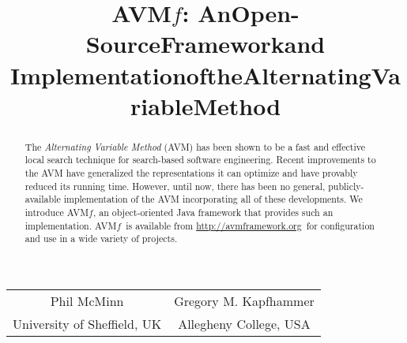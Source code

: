 \documentclass{llncs}
\newcommand{\AVM}{Alternating Variable Method\xspace}
\newcommand{\name}{\mbox{AVM\hspace{-1pt}$f$}\xspace}
\newcommand{\repourl}{\url{http://avmframework.org}\xspace}
\begin{document}
\title{\texorpdfstring{\name: An\:Open-Source\:Framework\:and\\$\!$$\!$$\!$Implementation\:of\:the\:Alternating\:Variable\:Method\vspace{-.75em}}{}}
\author{} %
\institute{} %
\maketitle

\vspace{-2em}
\begin{center}
\begin{tabular}{c@{\hskip 3em}c}
    Phil McMinn & Gregory M. Kapfhammer \\
    {\small University of Sheffield, UK} & {\small Allegheny College, USA} \\
\end{tabular}
\end{center}
\vspace{-2em}

\begin{abstract}
The {\it \AVM\/} (AVM) has been shown to be a fast and effective local search technique for %
search-based software engineering.
%
Recent improvements to the AVM have generalized the
representations it can optimize and have provably reduced its running time.
However, until now, there has been no general, publicly-available
implementation of the AVM
incorporating
all of these developments.
We introduce \name, an object-oriented
Java framework
that provides
such an implementation. \name~is available from \repourl~for configuration and use in a wide variety of projects.\vspace{-1ex}
\end{abstract}

\vspace{-2.5em}
\end{document}
